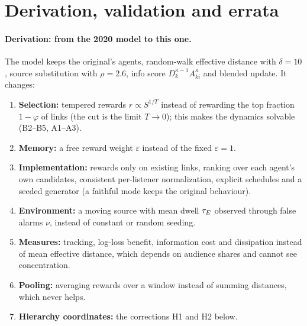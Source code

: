 \section{Derivation, validation and errata}\label{app:validation}

\paragraph{Derivation: from the 2020 model to this one.} The model keeps the original's agents, random-walk effective
distance with $\delta=10$, source substitution with $\rho=2.6$, info score $D_k^{\kappa-1}A_{ki}^\kappa$ and blended update.
It changes:
\begin{enumerate}
  \item \textbf{Selection:} tempered rewards $r\propto S^{1/T}$ instead of rewarding the top fraction $1-\varphi$ of links
    (the cut is the limit $T\to0$); this makes the dynamics solvable (B2--B5, A1--A3).
  \item \textbf{Memory:} a free reward weight $\varepsilon$ instead of the fixed $\varepsilon=1$.
  \item \textbf{Implementation:} rewards only on existing links, ranking over each agent's own candidates, consistent
    per-listener normalization, explicit schedules and a seeded generator (a faithful mode keeps the original behaviour).
  \item \textbf{Environment:} a moving source with mean dwell $\tau_E$ observed through false alarms $\nu$, instead of
    constant or random seeding.
  \item \textbf{Measures:} tracking, log-loss benefit, information cost and dissipation instead of mean effective
    distance, which depends on audience shares and cannot see concentration.
  \item \textbf{Pooling:} averaging rewards over a window instead of summing distances, which never helps.
  \item \textbf{Hierarchy coordinates:} the corrections H1 and H2 below.
\end{enumerate}

